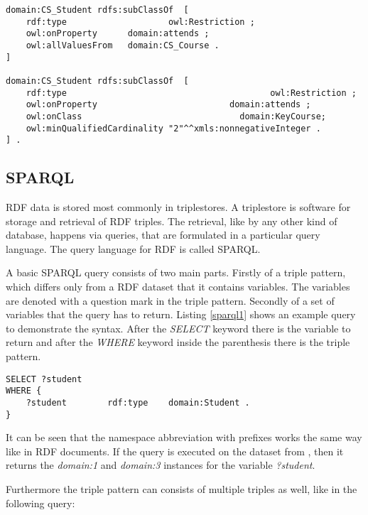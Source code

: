 \begin{lstlisting}[basicstyle=\footnotesize, captionpos=b, caption=Blank nodes in N3, label=lst:sparql, belowskip=1em, aboveskip=2em,
frame=single]
domain:CS_Student rdfs:subClassOf  [ 
	rdf:type					owl:Restriction ; 
	owl:onProperty		domain:attends ; 
	owl:allValuesFrom	domain:CS_Course .
]

domain:CS_Student rdfs:subClassOf  [
	rdf:type										owl:Restriction ; 
	owl:onProperty							domain:attends ; 
	owl:onClass								  domain:KeyCourse; 
	owl:minQualifiedCardinality "2"^^xmls:nonnegativeInteger .
] .
\end{lstlisting}


\subsection{SPARQL}


RDF data is stored most commonly in triplestores. A triplestore is software for storage and retrieval of RDF triples. The retrieval, like by any other kind of database, happens via queries, that are formulated in a particular query language. The query language for RDF is called SPARQL. 

A basic SPARQL query consists of two main parts. Firstly of a triple pattern, which differs only from a RDF dataset that it contains variables. The variables are denoted with a question mark in the triple pattern. Secondly of a set of variables that the query has to return. Listing \ref{sparql1} shows an example query to demonstrate the syntax. After the \textit{SELECT} keyword there is the variable to return and after the \textit{WHERE} keyword inside the parenthesis there is the triple pattern.

\begin{lstlisting}[captionpos=b, caption=SPARQL Query I., label=sparql1, belowskip=1em, aboveskip=2em, 
basicstyle=\footnotesize,frame=single]
SELECT ?student  
WHERE { 
	?student		rdf:type	domain:Student .	
}
\end{lstlisting}

It can be seen that the namespace abbreviation with prefixes works the same way like in RDF documents. If the query is executed on the dataset from , then it returns the \textit{domain:1} and \textit{domain:3} instances for the variable \textit{?student}. 


Furthermore the triple pattern can consists of  multiple triples as well, like in the following query:

